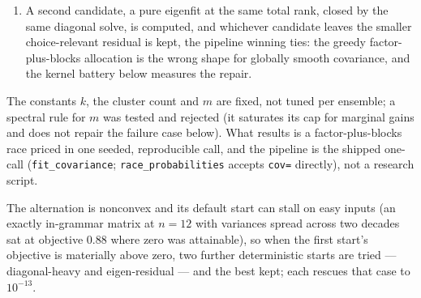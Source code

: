 \documentclass[11pt]{article}
\begin{document}
\begin{enumerate}
covariance residual sat one hundred times below the warning threshold. The Gram is exactly
$(1-\tfrac2n)I+\tfrac1{n^2}\mathbf{1}\mathbf{1}^{\top}$, so the
constrained solve is closed form in $O(n)$: substituting $d=\ell+x$
componentwise with $x\ge0$, writing $\ell$ for the vector of
per-runner floors, leaves the same Gram with a shifted right-hand side,
and the KKT conditions make the active set a threshold set, solved by
water-filling. It is the constrained minimizer, not an
unconstrained solve with a floor applied afterwards, which the Gram's
off-diagonal coupling would leave suboptimal. At $n=2$ the Gram is rank
one, only $d_1+d_2$ is identified, and the symmetric representative is
returned.
\item A second candidate, a pure eigenfit at the same total rank, closed by the same
diagonal solve, is computed, and whichever candidate leaves the
smaller choice-relevant residual is kept, the pipeline winning ties:
the greedy factor-plus-blocks allocation is the wrong shape for
globally smooth covariance, and the kernel battery below measures the repair.
\end{enumerate}

The constants $k$, the cluster count and $m$ are
fixed, not tuned per ensemble; a spectral rule for $m$ was tested and
rejected (it saturates its cap for marginal gains and does not repair the
failure case below). What results is a factor-plus-blocks race priced in
one seeded, reproducible call, and the pipeline
is the shipped one-call
(\texttt{fit\_covariance}; \texttt{race\_probabilities} accepts
\texttt{cov=} directly), not a research script.

The alternation
is nonconvex and its default start can stall on easy inputs (an exactly
in-grammar matrix at $n=12$ with variances spread across two decades sat
at objective $0.88$ where zero was attainable), so when the first
start's objective is materially above zero, two further deterministic
starts are tried --- diagonal-heavy and eigen-residual --- and the best
kept; each rescues that case to $10^{-13}$.
\end{document}
